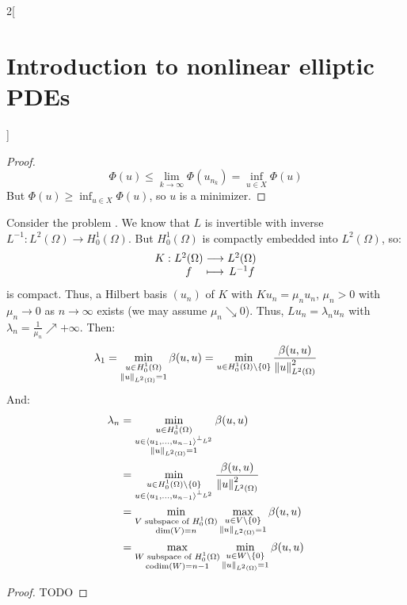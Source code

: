 \documentclass[../../../main_math.tex]{subfiles}
\begin{document}
\begin{multicols}{2}[\section{Introduction to nonlinear elliptic PDEs}]
\begin{proof}
    $$
      \Phi(u)\leq \lim_{k\to\infty}\Phi(u_{n_k})=\inf_{u\in X}\Phi(u)
    $$
    But $\displaystyle\Phi(u)\geq \inf_{u\in X}\Phi(u)$, so $u$ is a minimizer.
  \end{proof}
  \begin{theorem}
    Consider the problem . We know that $L$ is invertible with inverse $L^{-1}:L^2(\Omega)\to H_0^1(\Omega)$. But $H_0^1(\Omega)$ is compactly embedded into $L^2(\Omega)$, so:
    $$
      \function{K}{L^2(\Omega)}{L^2(\Omega)}{f}{L^{-1}f}
    $$
    is compact. Thus, a Hilbert basis $(u_n)$ of $K$ with $Ku_n=\mu_n u_n$, $\mu_n>0$ with $\mu_n\to 0$ as $n\to\infty$ exists (we may assume $\mu_n\searrow 0$). Thus, $Lu_n=\lambda_nu_n$ with $\lambda_n=\frac{1}{\mu_n}\nearrow+\infty$. Then:
    $$
      \lambda_1=\min_{\substack{u\in H_0^1(\Omega) \\ \left\|u\right\|_{L^2(\Omega)}=1}}\beta(u,u)=\min_{u\in H_0^1(\Omega)\setminus\{0\}}\frac{\beta(u,u)}{\left\|u\right\|_{L^2(\Omega)}^2}
    $$
    And:
    \begin{align*}
      \lambda_n & =\min_{\substack{u\in H_0^1(\Omega)                   \\u\in\langle u_1,\dots,u_{n-1}\rangle^{\perp_{L^2}}\\ \left\|u\right\|_{L^2(\Omega)}=1}}\beta(u,u)\\
                & = \min_{\substack{u\in H_0^1(\Omega)\setminus\{0\}    \\ u\in\langle u_1,\dots,u_{n-1}\rangle^{\perp_{L^2}}}}\frac{\beta(u,u)}{\left\|u\right\|_{L^2(\Omega)}^2}\\
                & =\min_{\substack{V\text{ subspace of }H_0^1(\Omega)   \\ \dim(V)=n}}\max_{\substack{u\in V\setminus\{0\} \\ \left\|u\right\|_{L^2(\Omega)}=1}}\beta(u,u)\\
                & = \max_{\substack{W\text{ subspace of } H_0^1(\Omega) \\ \mathrm{codim}(W)=n-1}}\min_{\substack{u\in W\setminus\{0\} \\ \left\|u\right\|_{L^2(\Omega)}=1}}\beta(u,u)
    \end{align*}
  \end{theorem}
  \begin{proof}
    TODO
  \end{proof}

\end{multicols}
\end{document}
